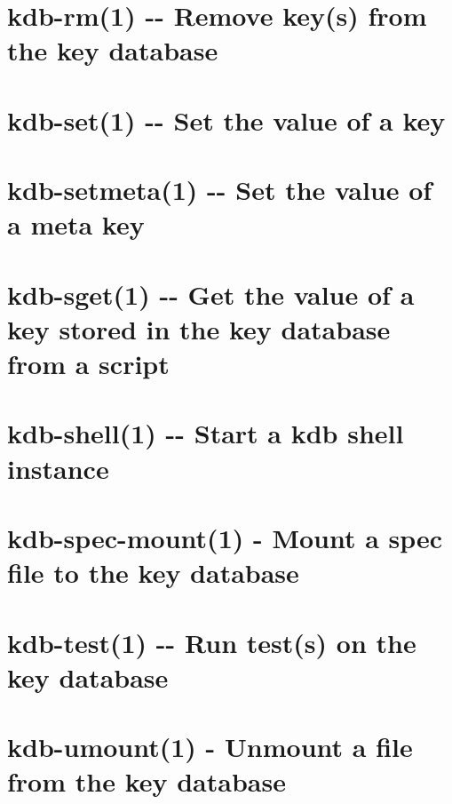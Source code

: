 \documentclass[twoside]{book}
\newcommand{\+}{\discretionary{\mbox{\scriptsize$\hookleftarrow$}}{}{}}
\begin{document}
\chapter{kdb-\/rm(1) -\/-\/ Remove key(s) from the key database}
\label{md_doc_help_kdb-rm}
\hypertarget{md_doc_help_kdb-rm}{}

\chapter{kdb-\/set(1) -\/-\/ Set the value of a key}
\label{md_doc_help_kdb-set}
\hypertarget{md_doc_help_kdb-set}{}

\chapter{kdb-\/setmeta(1) -\/-\/ Set the value of a meta key}
\label{md_doc_help_kdb-setmeta}
\hypertarget{md_doc_help_kdb-setmeta}{}

\chapter{kdb-\/sget(1) -\/-\/ Get the value of a key stored in the key database from a script}
\label{md_doc_help_kdb-sget}
\hypertarget{md_doc_help_kdb-sget}{}

\chapter{kdb-\/shell(1) -\/-\/ Start a kdb shell instance}
\label{md_doc_help_kdb-shell}
\hypertarget{md_doc_help_kdb-shell}{}

\chapter{kdb-\/spec-\/mount(1) -\/ Mount a spec file to the key database}
\label{md_doc_help_kdb-spec-mount}
\hypertarget{md_doc_help_kdb-spec-mount}{}

\chapter{kdb-\/test(1) -\/-\/ Run test(s) on the key database}
\label{md_doc_help_kdb-test}
\hypertarget{md_doc_help_kdb-test}{}

\chapter{kdb-\/umount(1) -\/ Unmount a file from the key database}
\label{md_doc_help_kdb-umount}
\hypertarget{md_doc_help_kdb-umount}{}

\end{document}

